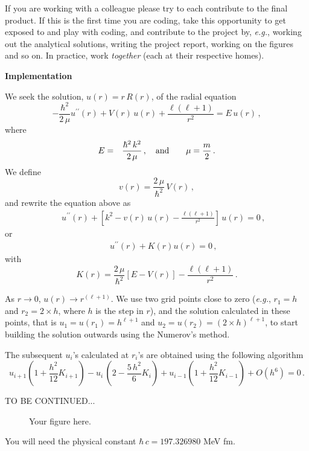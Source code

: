 \documentclass[11pt]{article}
\begin{document}
If you are working with a colleague please try to each contribute to the final product. 
If this is the first time you are coding, take this opportunity to get exposed 
to and play with coding, and contribute to the project by, {\it e.g.}, working out the
analytical solutions, writing the project report, working on the figures 
and so on. In practice, work {\it together} (each at their respective homes). 

\begin{center}
{\bf 
Implementation
}
\end{center}

We seek the solution, $u(r)=r\,R(r)$, of the radial equation
\begin{equation}
 -\frac{\hbar^2}{2\,\mu}u^{\prime\prime}(r) +V(r)\,u(r) +\frac{\ell(\ell+1)}{r^2}=E\,u(r)\, ,
\end{equation}
where 
\begin{eqnarray}
 E&=&\frac{\hbar^2\,k^2}{2\,\mu}\, , \quad {\rm and}\quad \quad  \mu=\frac{m}{2} \, .
\end{eqnarray}
We define
\begin{equation}
 v(r)=\frac{2\,\mu}{\hbar^2}\,V(r) \, ,
\end{equation}
and rewrite the equation above  as
\begin{eqnarray}
&& u^{\prime\prime}(r) +\left[k^2 - v(r)\,u(r) -\frac{\ell(\ell+1)}{r^2}\right]\,u(r)=0\, ,\nonumber 
\end{eqnarray}
or
\begin{eqnarray}
&& u^{\prime\prime}(r) + K(r) u(r)=0 \, ,
\end{eqnarray}
with 
\begin{equation}
 K(r)=\frac{2\,\mu}{\hbar^2}\left[E-V(r)\right] - \frac{\ell(\ell+1)}{r^2} \, .
\end{equation}

As $r\rightarrow 0$, $u(r)\rightarrow r^{(\ell+1)}$. We use two grid points 
close to zero ({\it e.g.}, $r_1=h$ and $r_2=2\times h$, where $h$ is the 
step in $r$), and the solution calculated in these points, that is 
$u_1=u(r_1)=h^{\ell+1}$ and $u_2=u(r_2)=(2\times h)^{\ell+1}$, to start building the
solution outwards using the Numerov's method. 

The subsequent $u_i$'s calculated at $r_i$'s are obtained using the following
algorithm
\begin{equation}
u_{i+1}\left(1+\frac{h^2}{12}K_{i+1} \right) -u_i\,\left(2-\frac{5\,h^2}{6}K_i\right)+
u_{i-1}\left(1+\frac{h^2}{12}K_{i-1} \right) +O(h^6)=0 \nonumber \, . 
\end{equation}

TO BE CONTINUED...
\begin{figure}
 \caption{Your figure here.}
\label{fig:yourfigure}
\end{figure}
% 
 
You will need the physical constant $\hbar\,c = 197.326980$ MeV fm.
\end{document}
